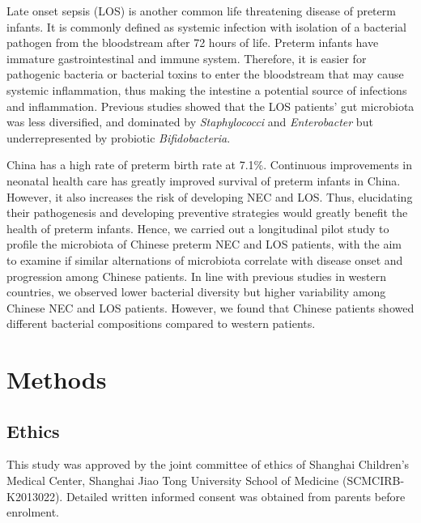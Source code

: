 \documentclass[fleqn,10pt]{wlpeerj} %
\begin{document}
Late onset sepsis (LOS) is another common life threatening disease of preterm infants. It is commonly defined as systemic infection with isolation of a bacterial pathogen from the bloodstream after 72 hours of life\citep{rao2016one, pickering2012red}. Preterm infants have immature gastrointestinal and immune system. Therefore, it is easier for  pathogenic bacteria or bacterial toxins to enter the bloodstream that may cause systemic inflammation\citep{schwiertz2003development, bezirtzoglou2011microbiota, Cernada2016Sepsis, Sharon2015Gut, korpela2018intestinal}, thus making the intestine a potential source of infections and inflammation. Previous studies showed that the LOS patients' gut microbiota was less diversified, and dominated by \textit{Staphylococci} and \textit{Enterobacter} but underrepresented by probiotic \textit{Bifidobacteria}\citep{madan2012gut,tarr2016gut,Stewart2017Longitudinal,korpela2018intestinal,ficara2018changes}.

China has a high rate of preterm birth rate at 7.1\%\citep{blencowe2012national}. Continuous improvements in neonatal health care has greatly improved survival of preterm infants in China.  However, it also increases the risk of developing NEC and LOS. Thus, elucidating their pathogenesis and developing preventive strategies would  greatly benefit  the health of preterm infants. Hence, we carried out a longitudinal pilot study to profile the microbiota of Chinese preterm NEC and LOS patients, with the aim to examine if similar alternations of microbiota correlate with disease onset and progression among Chinese patients. In line with previous studies in western countries, we observed lower bacterial diversity but higher variability among Chinese NEC and LOS patients.  However, we found that Chinese patients showed different bacterial compositions compared to western patients.


\section*{Methods}
  \subsection*{Ethics}
  This study was approved by the joint committee of ethics of Shanghai Children’s Medical Center, Shanghai Jiao Tong University School of Medicine (SCMCIRB-K2013022). Detailed written informed consent was obtained from parents before enrolment.
\end{document}
